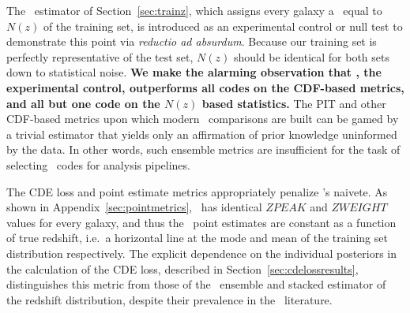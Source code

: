 The \trainz\ estimator of Section~\ref{sec:trainz}, which assigns every galaxy a \pzpdf\ equal to $N(z)$ of the training set, is introduced as an experimental control or null test to demonstrate this point via \textit{reductio ad absurdum}.
Because our training set is perfectly representative of the test set, $N(z)$ should be identical for both sets down to statistical noise.
\textbf{We make the alarming observation that \trainz, the experimental control, outperforms all codes on the CDF-based metrics, and all but one code on the $N(z)$ based statistics.}
The PIT and other CDF-based metrics upon which modern \pzpdf\ comparisons are built \citep{Bordoloi:10,Polsterer:16,Tanaka:17} can be gamed by a trivial estimator that yields only an affirmation of prior knowledge uninformed by the data.
In other words, such ensemble metrics are insufficient for the task of selecting \pzpdf\ codes for analysis pipelines.

The CDE loss and point estimate metrics appropriately penalize \trainz's naivete.
As shown in Appendix~\ref{sec:pointmetrics}, \trainz ~has identical $ZPEAK$ and $ZWEIGHT$ values for every galaxy, and thus the \pz\ point estimates are constant as a function of true redshift, i.e.~a horizontal line at the mode and mean of the training set distribution respectively.
The explicit dependence on the individual posteriors in the calculation of the CDE loss, described in Section~\ref{sec:cdelossresults}, distinguishes this metric from those of the \pzpdf\ ensemble and stacked estimator of the redshift distribution, despite their prevalence in the \pz\ literature.

